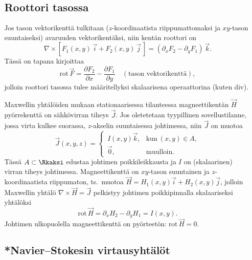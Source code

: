 \subsection*{Roottori tasossa}

Jos tason vektorikenttä tulkitaan ($z$-koordinaatista riippumattomaksi ja $xy$-tason
suuntaiseksi) avaruuden vektorikentäksi, niin kentän roottori on
\[
\nabla\times[F_1(x,y)\,\vec i+F_2(x,y)\,\vec j\,] =(\partial_x F_2-\partial_y F_1)\,\vec k.
\]
Tässä on tapana kirjoittaa
\[
\text{rot}\,\vec F = \frac{\partial F_2}{\partial x}-\frac{\partial F_1}{\partial y}
                   \quad (\text{tason vektorikenttä}),
\]
jolloin roottori tasossa tulee määritellyksi skalaarisena operaattorina (kuten div). 
\begin{Exa} Maxwellin yhtälöiden mukaan stationaarisessa tilanteessa magneettikentän $\vec H$
pyörrekenttä on sähkövirran tiheys $\vec J$. Jos oletetetaan tyypillinen sovellustilanne,
jossa virta kulkee suorassa, $z$-akselin suuntaisessa johtimessa, niin $\vec J$ on muotoa
\[
\vec J(x,y,z)=\begin{cases} 
              \,I(x,y)\vec k, &\text{kun}\ (x,y) \in A, \\ \,\vec 0, &\text{muulloin}.
              \end{cases}
\]
Tässä $A\subset\Rkaksi$ edustaa johtimen poikkileikkausta ja $I$ on (skalaarinen) virran tiheys
johtimessa. Magneettikenttä on $xy$-tason suuntainen ja $z$-koordinaatista riippumaton,
ts.\ muotoa $\vec H = H_1(x,y)\vec i + H_2(x,y)\vec j$, jolloin Maxwellin yhtälö 
$\nabla\times\vec H=\vec J$ pelkistyy johtimen poikkipinnalla skalaariseksi yhtälöksi
\[
\text{rot}\,\vec H = \partial_x H_2 - \partial_y H_1 = I(x,y).
\]
Johtimen ulkopuolella magneettikenttä on pyörteetön: $\text{rot}\,\vec H=0$. \loppu
\end{Exa}

\subsection*{*Navier--Stokesin virtausyhtälöt}

